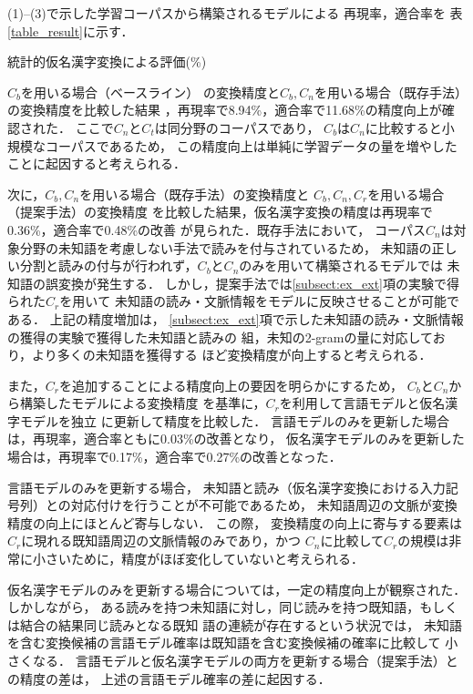 \documentclass[japanese]{jnlp_1.4}
\begin{document}
(1)--(3)で示した学習コーパスから構築されるモデルによる
再現率，適合率を
表\ref{table_result}に示す．

\begin{table}[b]
  \caption{統計的仮名漢字変換による評価(\%)}

  \label{table_result}
\end{table}

$C_b$を用いる場合（ベースライン）
の変換精度と$C_b, C_n$を用いる場合（既存手法）の変換精度を比較した結果
，再現率で8.94\%，適合率で11.68\%の精度向上が確認された．
ここで$C_n$と$C_t$は同分野のコーパスであり，
$C_b$は$C_n$に比較すると小規模なコーパスであるため，
この精度向上は単純に学習データの量を増やしたことに起因すると考えられる．

次に，$C_b, C_n$を用いる場合（既存手法）の変換精度と
$C_b, C_n, C_r$を用いる場合（提案手法）の変換精度
を比較した結果，仮名漢字変換の精度は再現率で0.36\%，適合率で0.48\%の改善
が見られた．既存手法において，
コーパス$C_n$は対象分野の未知語を考慮しない手法で読みを付与されているため，
未知語の正しい分割と読みの付与が行われず，$C_b$と$C_n$のみを用いて構築されるモデルでは
未知語の誤変換が発生する．
しかし，提案手法では\ref{subsect:ex_ext}項の実験で得られた$C_rを用いて$
未知語の読み・文脈情報をモデルに反映させることが可能である．
上記の精度増加は，
\ref{subsect:ex_ext}項で示した未知語の読み・文脈情報の獲得の実験で獲得した未知語と読みの
組，未知の2-gramの量に対応しており，より多くの未知語を獲得する
ほど変換精度が向上すると考えられる．

また，$C_r$を追加することによる精度向上の要因を明らかにするため，
$C_b$と$C_n$から構築したモデルによる変換精度
を基準に，$C_r$を利用して言語モデルと仮名漢字モデルを独立
に更新して精度を比較した．
言語モデルのみを更新した場合は，再現率，適合率ともに0.03\%の改善となり，
仮名漢字モデルのみを更新した場合は，再現率で0.17\%，適合率で0.27\%の改善となった．

言語モデルのみを更新する場合，
未知語と読み（仮名漢字変換における入力記号列）との対応付けを行うことが不可能であるため，
未知語周辺の文脈が変換精度の向上にほとんど寄与しない．
この際，
変換精度の向上に寄与する要素は$C_r$に現れる既知語周辺の文脈情報のみであり，かつ
$C_n$に比較して$C_r$の規模は非常に小さいために，精度がほぼ変化していないと考えられる．

仮名漢字モデルのみを更新する場合については，一定の精度向上が観察された．
しかしながら，
ある読みを持つ未知語に対し，同じ読みを持つ既知語，もしくは結合の結果同じ読みとなる既知
語の連続が存在するという状況では，
未知語を含む変換候補の言語モデル確率は既知語を含む変換候補の確率に比較して
小さくなる．
言語モデルと仮名漢字モデルの両方を更新する場合（提案手法）との精度の差は，
上述の言語モデル確率の差に起因する．
\end{document}
